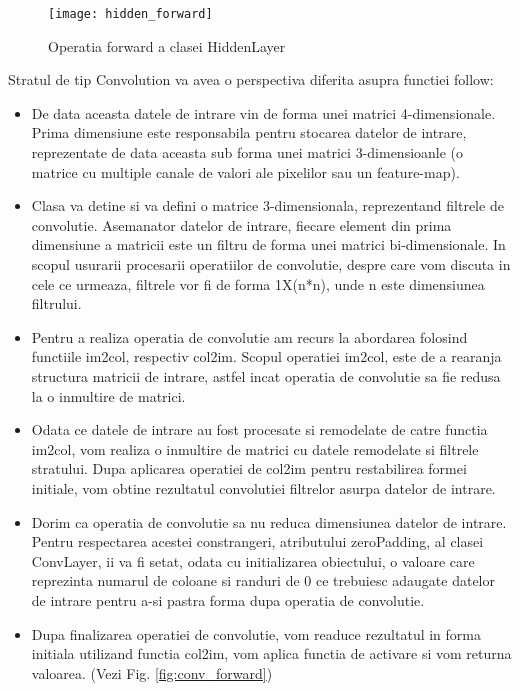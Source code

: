 	\vfill
	
	\begin{figure}[H]
		\texttt{[image: hidden\_forward]}  
		\caption{\label{fig:hidden_forward} Operatia forward a clasei HiddenLayer}
	\end{figure}

	\newpage
	
	Stratul de tip Convolution va avea o perspectiva diferita asupra functiei follow:
	\begin{itemize}
		
	\item	 De data aceasta datele de intrare vin de forma unei matrici 4-dimensionale. Prima dimensiune este responsabila pentru stocarea datelor de intrare, reprezentate de data aceasta sub forma unei matrici 3-dimensioanle (o matrice cu multiple canale de valori ale pixelilor sau un feature-map).
	
	\item	Clasa va detine si va defini o matrice 3-dimensionala, reprezentand filtrele de convolutie. Asemanator datelor de intrare, fiecare element din prima dimensiune a matricii este un filtru de forma unei matrici bi-dimensionale. In scopul usurarii procesarii operatiilor de convolutie, despre care vom discuta in cele ce urmeaza, filtrele vor fi de forma 1X(n*n), unde n este dimensiunea filtrului.
	
	
	\item	Pentru a realiza operatia de convolutie am recurs la abordarea folosind functiile im2col, respectiv col2im. Scopul operatiei im2col, este de a rearanja structura matricii de intrare, astfel incat operatia de convolutie sa fie redusa la o inmultire de matrici.
	
	\item	Odata ce datele de intrare au fost procesate si remodelate de catre functia im2col, vom realiza o inmultire de matrici cu datele remodelate si filtrele stratului. Dupa aplicarea operatiei de col2im pentru restabilirea formei initiale, vom obtine rezultatul convolutiei filtrelor asurpa datelor de intrare.
	
	
	\item	Dorim ca operatia de convolutie sa nu reduca dimensiunea datelor de intrare. Pentru respectarea acestei constrangeri, atributului zeroPadding, al clasei ConvLayer, ii va fi setat, odata cu initializarea obiectului, o valoare care reprezinta numarul de coloane si randuri de 0 ce trebuiesc adaugate datelor de intrare pentru a-si pastra forma dupa operatia de convolutie.
	
	\item	Dupa finalizarea operatiei de convolutie, vom readuce rezultatul in forma initiala utilizand functia col2im, vom aplica functia de activare si vom returna valoarea. 	(Vezi Fig. \ref{fig:conv_forward})

	\end{itemize}

